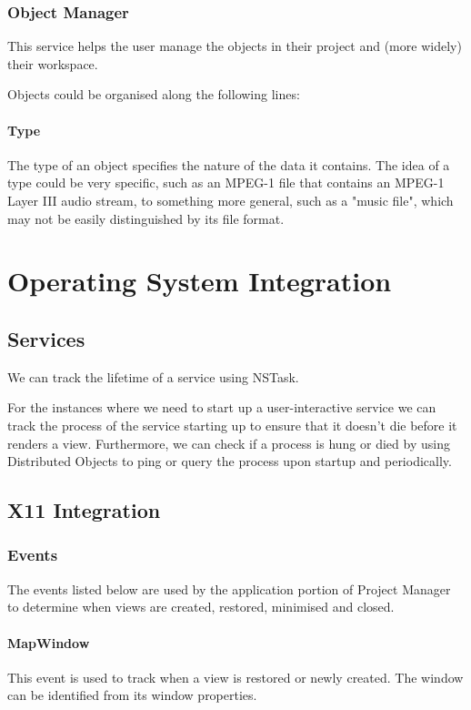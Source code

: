 \documentclass[11pt]{report}
\newcommand{\proman}{Project Manager\xspace}
\begin{document}
\subsection{Object Manager}

This service helps the user manage the objects in their project and (more widely) their workspace.

Objects could be organised along the following lines:

\subsubsection{Type} 
The type of an object specifies the nature of the data it contains. The idea of a type could be very specific, such as an MPEG-1 file that contains an MPEG-1 Layer III audio stream, to something more general, such as a "music file", which may not be easily distinguished by its file format.

\chapter{Operating System Integration}
\section{Services}
We can track the lifetime of a service using NSTask.

For the instances where we need to start up a user-interactive service we can track the process of the service starting up to ensure that it doesn't die before it renders a view. Furthermore, we can check if a process is hung or died by using Distributed Objects to ping or query the process upon startup and periodically.
\section{X11 Integration}
\label{sec:x11_integration}
\subsection{Events}
The events listed below are used by the application portion of \proman to determine when views are created, restored, minimised and closed.
\subsubsection{MapWindow}
This event is used to track when a view is restored or newly created. The window can be identified from its window properties.
\end{document}
